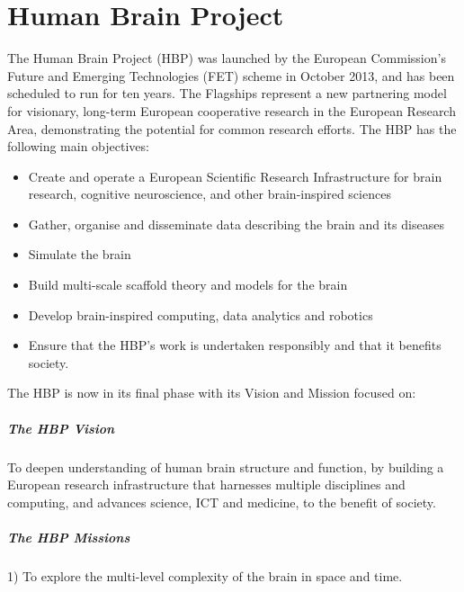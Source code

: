 
\chapter{Human Brain Project}

The Human Brain Project (HBP) was launched by the European Commission's Future and 
Emerging Technologies (FET) scheme in October 2013, and has been 
scheduled to run for ten years. The Flagships represent a new partnering
 model for visionary, long-term European cooperative research in the 
 European Research Area, demonstrating the potential for common research
  efforts. The HBP has the following main objectives:

\begin{itemize}
    \item Create and operate a European Scientific Research Infrastructure for brain research, cognitive neuroscience, and other brain-inspired sciences
    \item Gather, organise and disseminate data describing the brain and its diseases
    \item Simulate the brain
    \item Build multi-scale scaffold theory and models for the brain
    \item Develop brain-inspired computing, data analytics and robotics
    \item Ensure that the HBP's work is undertaken responsibly and that it benefits society.
\end{itemize}

The HBP is now in its final phase with its Vision and Mission focused on:

\paragraph{The HBP Vision}

To deepen understanding of human brain structure and function, by 
building a European research infrastructure that harnesses multiple disciplines and computing, and advances science, ICT and medicine, to the benefit of society.

\paragraph{The HBP Missions}

1) To explore the multi-level complexity of the brain in space and time.

